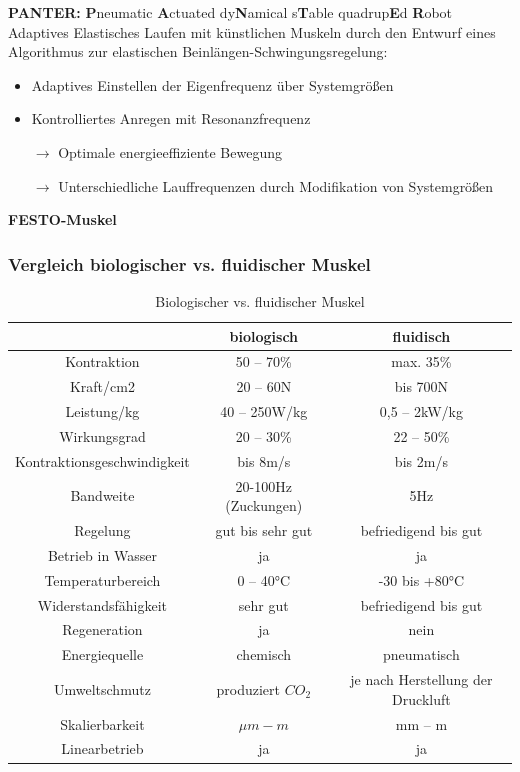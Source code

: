 \textbf{PANTER:} \textbf{P}neumatic \textbf{A}ctuated dy\textbf{N}amical s\textbf{T}able quadrup\textbf{E}d \textbf{R}obot\\
Adaptives Elastisches Laufen mit künstlichen Muskeln durch den Entwurf eines Algorithmus zur elastischen Beinlängen-Schwingungsregelung:
\begin{itemize}
	\item Adaptives Einstellen der Eigenfrequenz über Systemgrößen
	\item Kontrolliertes Anregen mit Resonanzfrequenz
	\item[$\rightarrow$] Optimale energieeffiziente Bewegung
	\item[$\rightarrow$] Unterschiedliche Lauffrequenzen durch Modifikation von
Systemgrößen
\end{itemize}

\textbf{FESTO-Muskel}

\subsubsection{Vergleich biologischer vs. fluidischer Muskel}
\begin{table}[hbt]
\centering
\begin{tabular}{|c||c|c|}
\hline
 & \textbf{biologisch} & \textbf{fluidisch} \\
\hline
Kontraktion &  50 – 70\%  & max. 35\%\\
Kraft/cm2  & 20 – 60N  & bis 700N\\
Leistung/kg  & 40 – 250W/kg  & 0,5 – 2kW/kg\\
Wirkungsgrad  & 20 – 30\%  & 22 – 50\%\\
Kontraktionsgeschwindigkeit  & bis 8m/s  & bis 2m/s\\
Bandweite  & 20-100Hz (Zuckungen) & 5Hz\\
Regelung & gut bis sehr gut & befriedigend bis gut\\
Betrieb in Wasser & ja & ja\\
Temperaturbereich & 0 – 40°C & -30 bis +80°C\\
Widerstandsfähigkeit & sehr gut & befriedigend bis gut\\
Regeneration & ja & nein\\
Energiequelle & chemisch & pneumatisch\\
Umweltschmutz & produziert $CO_2$ & je nach Herstellung der Druckluft\\
Skalierbarkeit & $\mu m - m$ & mm – m\\
Linearbetrieb & ja & ja\\
\hline
\end{tabular}
\caption{Biologischer vs. fluidischer Muskel}
\label{tab:Vergleich}
\end{table}
\newpage